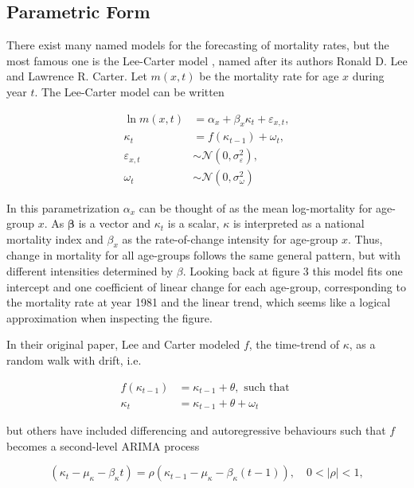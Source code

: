 \documentclass[
]{book}
\begin{document}
\hypertarget{parametric-form}{%
\subsection{Parametric Form}\label{parametric-form}}

There exist many named models for the forecasting of mortality rates, but the most famous one is the Lee-Carter model \citep{lee1992modeling}, named after its authors Ronald D. Lee and Lawrence R. Carter. Let \(m(x, t)\) be the mortality rate for age \(x\) during year \(t\). The Lee-Carter model can be written

\[
\begin{aligned}
\ln m(x, t) &= \alpha_x + \beta_x \kappa_t + \varepsilon_{x, t}, \\
\kappa_t &= f(\kappa_{t - 1}) + \omega_t, \\
\varepsilon_{x,t} &\sim  \mathcal N(0, \sigma^2_{\varepsilon}), \\
\omega_t &\sim \mathcal N(0, \sigma^2_{\omega})
\end{aligned}
\]

In this parametrization \(\alpha_x\) can be thought of as the mean log-mortality for age-group \(x\). As \(\mathbf \beta\) is a vector and \(\kappa_t\) is a scalar, \(\kappa\) is interpreted as a national mortality index and \(\beta_x\) as the rate-of-change intensity for age-group \(x\). Thus, change in mortality for all age-groups follows the same general pattern, but with different intensities determined by \(\beta\). Looking back at figure 3 this model fits one intercept and one coefficient of linear change for each age-group, corresponding to the mortality rate at year 1981 and the linear trend, which seems like a logical approximation when inspecting the figure.

In their original paper, Lee and Carter modeled \(f\), the time-trend of \(\kappa\), as a random walk with drift, i.e.

\[
\begin{aligned}
f(\kappa_{t-1}) &= \kappa_{t-1} + \theta, \textrm{ such that } \\
\kappa_t &= \kappa_{t-1} + \theta + \omega_t
\end{aligned}
\]

but others have included differencing and autoregressive behaviours such that \(f\) becomes a second-level ARIMA process

\[
(\kappa_t - \mu_\kappa - \beta_\kappa t) = \rho(\kappa_{t-1} - \mu_\kappa - \beta_\kappa (t-1)), \quad 0 < \vert\rho\vert < 1,
\]
\end{document}

